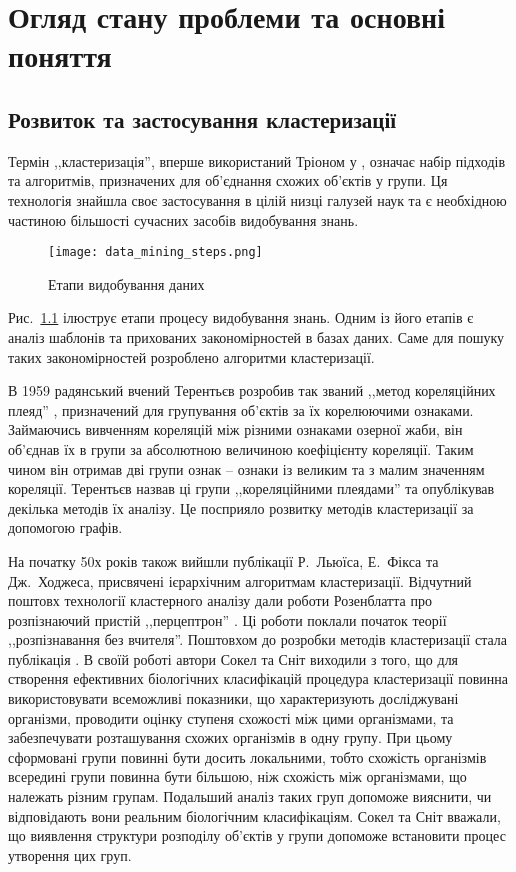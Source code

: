 \chapter{Огляд стану проблеми та основні поняття}\label{ch:01}

\section{Розвиток та застосування кластеризації}
    Термін ,,кластеризація'', вперше використаний Тріоном у \cite{Tryon:Cluster:1939}, означає набір підходів та алгоритмів, призначених для об'єднання схожих об'єктів у групи. Ця технологія знайшла своє застосування в цілій низці галузей наук та є необхідною частиною більшості сучасних засобів видобування знань.
   
    \begin{figure}
        \centering
        \texttt{[image: data\_mining\_steps.png]}
        \caption{Етапи видобування даних}\label{fig:data_mining_steps}
    \end{figure}
    
    Рис.~\ref{fig:data_mining_steps} ілюструє етапи процесу видобування знань. Одним із його етапів є аналіз шаблонів та прихованих закономірностей в базах даних. Саме для пошуку таких закономірностей розроблено алгоритми кластеризації.
 
    В 1959 радянський вчений Терентьєв розробив так званий ,,метод кореляційних плеяд'' \cite{Terentyev}, призначений для групування об'єктів за їх корелюючими ознаками. Займаючись вивченням кореляцій між різними ознаками озерної жаби, він об'єднав їх в групи за абсолютною величиною коефіцієнту кореляції. Таким чином він отримав дві групи ознак -- ознаки із великим та з малим значенням кореляції. Терентьєв назвав ці групи ,,кореляційними плеядами'' та опублікував декілька методів їх аналізу. Це посприяло розвитку методів кластеризації за допомогою графів.
    
    На початку 50х років також вийшли публікації Р.~Льюїса, Е.~Фікса та Дж.~Ходжеса, присвячені ієрархічним алгоритмам кластеризації. Відчутний поштовх технології кластерного аналізу дали роботи Розенблатта про розпізнаючий пристій ,,перцептрон'' \cite{Rosenblatt}. Ці роботи поклали початок теорії ,,розпізнавання без вчителя''. Поштовхом до розробки методів кластеризації стала публікація \cite{SokalSneath}. В своїй роботі автори Сокел та Сніт виходили з того, що для створення ефективних біологічних класифікацій процедура кластеризації повинна використовувати всеможливі показники, що характеризують досліджувані організми, проводити оцінку ступеня схожості між цими організмами, та забезпечувати розташування схожих організмів в одну групу. При цьому сформовані групи повинні бути досить локальними, тобто схожість організмів всередині групи повинна бути більшою, ніж схожість між організмами, що належать різним групам. Подальший аналіз таких груп допоможе вияснити, чи відповідають вони реальним біологічним класифікаціям. Сокел та Сніт вважали, що виявлення структури розподілу об'єктів у групи допоможе встановити процес утворення цих груп.
    
